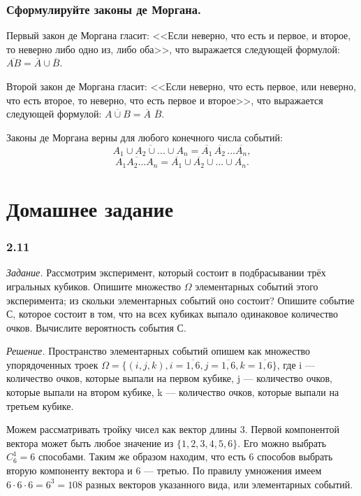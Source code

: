 \documentclass{book}
\begin{document}
\subsubsection*{Сформулируйте законы де Моргана.}

Первый закон де Моргана гласит: <<Если неверно, что есть и первое, и второе, то неверно либо одно из, либо оба>>, что выражается следующей формулой: $\overline{AB}=\overline{A}\cup\overline{B}$.

Второй закон де Моргана гласит: <<Если неверно, что есть первое, или неверно, что есть второе, то неверно, что есть первое и второе>>, что выражается следующей формулой: $\overline{A\cup B}=\overline{A}$ $\overline{B}$.

Законы де Моргана верны для любого конечного числа событий: $$\overline{A_1\cup A_2\cup...\cup A_n}=\overline{A_1}\,\overline{A_2}\,...\overline{A_n},$$ $$\overline{A_1A_2...A_n}=\overline{A_1}\cup\overline{A_2}\cup...\cup\overline{A_n}.$$

\section*{Домашнее задание}

\subsubsection*{2.11}

\textit{Задание.} Рассмотрим эксперимент, который состоит в подбрасывании трёх игральных кубиков. Опишите множество $\Omega$ элементарных событий этого эксперимента; из скольки элементарных событий оно состоит? Опишите событие С, которое состоит в том, что на всех кубиках выпало одинаковое количество очков. Вычислите вероятность события С.

\textit{Решение.} Пространство элементарных событий опишем как множество упорядоченных троек $\Omega=\{\left(i, j, k\right), i=\overline{1, 6}, j=\overline{1, 6}, k=\overline{1, 6}\}$, где i --- количество очков, которые выпали на первом кубике, j --- количество очков, которые выпали на втором кубике, k --- количество очков, которые выпали на третьем кубике.

Можем рассматривать тройку чисел как вектор длины 3. Первой компонентой вектора может быть любое значение из $\{1, 2, 3, 4, 5, 6\}$. Его можно выбрать $C_6^1=6$ способами. Таким же образом находим, что есть 6 способов выбрать вторую компоненту вектора и 6 --- третью. По правилу умножения имеем $6\cdot 6\cdot 6=6^3=108$ разных векторов указанного вида, или элементарных событий.
\end{document}
